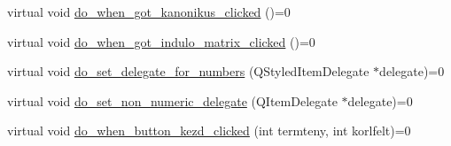 \begin{DoxyCompactItemize}
virtual void \hyperlink{classMainwindow__Gui__Plugin__Interface_a81663cee1a75c8ed846e84c402dbc26c}{do\+\_\+when\+\_\+got\+\_\+kanonikus\+\_\+clicked} ()=0
\item 
virtual void \hyperlink{classMainwindow__Gui__Plugin__Interface_a914d476057d5060ff6cacbcb8a0e235b}{do\+\_\+when\+\_\+got\+\_\+indulo\+\_\+matrix\+\_\+clicked} ()=0
\item 
virtual void \hyperlink{classMainwindow__Gui__Plugin__Interface_a4c51240554e5ffdcf7a32adfc52a3056}{do\+\_\+set\+\_\+delegate\+\_\+for\+\_\+numbers} (Q\+Styled\+Item\+Delegate $\ast$delegate)=0
\item 
virtual void \hyperlink{classMainwindow__Gui__Plugin__Interface_ac094d5dc4a7cbb1756795edc0409787e}{do\+\_\+set\+\_\+non\+\_\+numeric\+\_\+delegate} (Q\+Item\+Delegate $\ast$delegate)=0
\item 
virtual void \hyperlink{classMainwindow__Gui__Plugin__Interface_adb2a0db1dc3a4acbbe3face497fea03d}{do\+\_\+when\+\_\+button\+\_\+kezd\+\_\+clicked} (int termteny, int korlfelt)=0
\end{DoxyCompactItemize}
